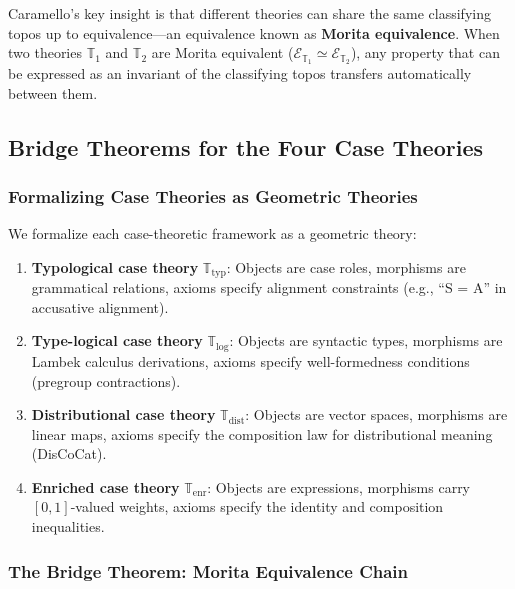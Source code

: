 \documentclass[
]{article}
\numberwithin{equation}{section}
\begin{document}
Caramello's key insight
\citetext{\citeyear{caramello2016bridges}; \citeyear{caramello2021five}}
is that different theories can share the same classifying topos up to
equivalence---an equivalence known as \textbf{Morita equivalence}. When
two theories \(\mathbb{T}_1\) and \(\mathbb{T}_2\) are Morita equivalent
(\(\mathcal{E}_{\mathbb{T}_1} \simeq \mathcal{E}_{\mathbb{T}_2}\)), any
property that can be expressed as an invariant of the classifying topos
transfers automatically between them.

\subsection{Bridge Theorems for the Four Case
Theories}\label{bridge-theorems-for-the-four-case-theories}

\subsubsection{Formalizing Case Theories as Geometric
Theories}\label{formalizing-case-theories-as-geometric-theories}

We formalize each case-theoretic framework as a geometric theory:

\begin{enumerate}
\def\labelenumi{\arabic{enumi}.}
\item
  \textbf{Typological case theory} \(\mathbb{T}_{\text{typ}}\): Objects
  are case roles, morphisms are grammatical relations, axioms specify
  alignment constraints (e.g., ``S = A'' in accusative alignment).
\item
  \textbf{Type-logical case theory} \(\mathbb{T}_{\text{log}}\): Objects
  are syntactic types, morphisms are Lambek calculus derivations, axioms
  specify well-formedness conditions (pregroup contractions).
\item
  \textbf{Distributional case theory} \(\mathbb{T}_{\text{dist}}\):
  Objects are vector spaces, morphisms are linear maps, axioms specify
  the composition law for distributional meaning (DisCoCat).
\item
  \textbf{Enriched case theory} \(\mathbb{T}_{\text{enr}}\): Objects are
  expressions, morphisms carry \([0,1]\)-valued weights, axioms specify
  the identity and composition inequalities.
\end{enumerate}

\subsubsection{The Bridge Theorem: Morita Equivalence
Chain}\label{the-bridge-theorem-morita-equivalence-chain}
\end{document}
